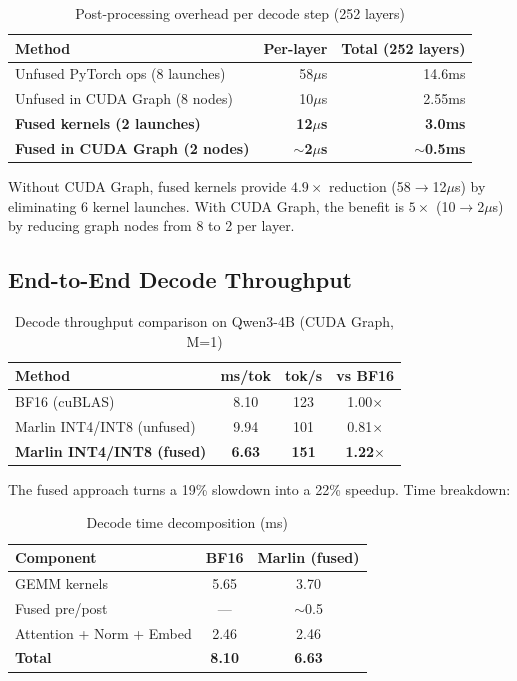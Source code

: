 \documentclass[11pt,a4paper]{article}
\begin{document}
\begin{table}[h]
\centering
\caption{Post-processing overhead per decode step (252 layers)}
\label{tab:overhead}
\begin{tabular}{lrr}
\toprule
Method & Per-layer & Total (252 layers) \\
\midrule
Unfused PyTorch ops (8 launches) & 58$\mu$s & 14.6ms \\
Unfused in CUDA Graph (8 nodes) & 10$\mu$s & 2.55ms \\
\textbf{Fused kernels (2 launches)} & \textbf{12$\mu$s} & \textbf{3.0ms} \\
\textbf{Fused in CUDA Graph (2 nodes)} & \textbf{$\sim$2$\mu$s} & \textbf{$\sim$0.5ms} \\
\bottomrule
\end{tabular}
\end{table}

Without CUDA Graph, fused kernels provide $4.9\times$ reduction (58$\to$12$\mu$s) by eliminating 6 kernel launches. With CUDA Graph, the benefit is $5\times$ (10$\to$2$\mu$s) by reducing graph nodes from 8 to 2 per layer.

\subsection{End-to-End Decode Throughput}

\begin{table}[h]
\centering
\caption{Decode throughput comparison on Qwen3-4B (CUDA Graph, M=1)}
\label{tab:e2e}
\begin{tabular}{lccc}
\toprule
Method & ms/tok & tok/s & vs BF16 \\
\midrule
BF16 (cuBLAS) & 8.10 & 123 & 1.00$\times$ \\
Marlin INT4/INT8 (unfused) & 9.94 & 101 & 0.81$\times$ \\
\textbf{Marlin INT4/INT8 (fused)} & \textbf{6.63} & \textbf{151} & \textbf{1.22$\times$} \\
\bottomrule
\end{tabular}
\end{table}

The fused approach turns a 19\% slowdown into a 22\% speedup. Time breakdown:

\begin{table}[h]
\centering
\caption{Decode time decomposition (ms)}
\label{tab:decomp}
\begin{tabular}{lcc}
\toprule
Component & BF16 & Marlin (fused) \\
\midrule
GEMM kernels & 5.65 & 3.70 \\
Fused pre/post & --- & $\sim$0.5 \\
Attention + Norm + Embed & 2.46 & 2.46 \\
\midrule
\textbf{Total} & \textbf{8.10} & \textbf{6.63} \\
\bottomrule
\end{tabular}
\end{table}
\end{document}
